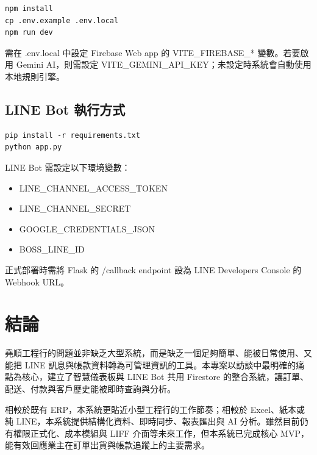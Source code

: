 \documentclass[12pt,a4paper,UTF8,fontset=none]{ctexart}
\newcommand{\code}[1]{{\ttfamily\small #1}}
\begin{document}
\begin{verbatim}
npm install
cp .env.example .env.local
npm run dev
\end{verbatim}

需在 \code{.env.local} 中設定 Firebase Web app 的 \code{VITE\_FIREBASE\_*} 變數。若要啟用 Gemini AI，則需設定 \code{VITE\_GEMINI\_API\_KEY}；未設定時系統會自動使用本地規則引擎。

\subsection{LINE Bot 執行方式}

\begin{verbatim}
pip install -r requirements.txt
python app.py
\end{verbatim}

LINE Bot 需設定以下環境變數：

\begin{itemize}
  \item \code{LINE\_CHANNEL\_ACCESS\_TOKEN}
  \item \code{LINE\_CHANNEL\_SECRET}
  \item \code{GOOGLE\_CREDENTIALS\_JSON}
  \item \code{BOSS\_LINE\_ID}
\end{itemize}

正式部署時需將 Flask 的 \code{/callback} endpoint 設為 LINE Developers Console 的 Webhook URL。

\section{結論}

堯順工程行的問題並非缺乏大型系統，而是缺乏一個足夠簡單、能被日常使用、又能把 LINE 訊息與帳款資料轉為可管理資訊的工具。本專案以訪談中最明確的痛點為核心，建立了智慧儀表板與 LINE Bot 共用 Firestore 的整合系統，讓訂單、配送、付款與客戶歷史能被即時查詢與分析。

相較於既有 ERP，本系統更貼近小型工程行的工作節奏；相較於 Excel、紙本或純 LINE，本系統提供結構化資料、即時同步、報表匯出與 AI 分析。雖然目前仍有權限正式化、成本模組與 LIFF 介面等未來工作，但本系統已完成核心 MVP，能有效回應業主在訂單出貨與帳款追蹤上的主要需求。
\end{document}
